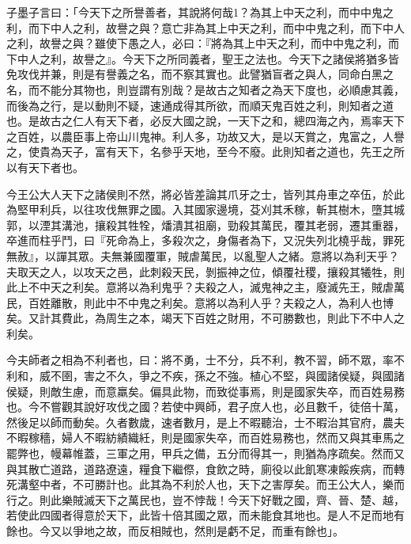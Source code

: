 
\begin{pinyinscope}
子墨子言曰：「今天下之所譽善者，其說將何哉1？為其上中天之利，而中中鬼之利，而下中人之利，故譽之與？意亡非為其上中天之利，而中中鬼之利，而下中人之利，故譽之與？雖使下愚之人，必曰：『將為其上中天之利，而中中鬼之利，而下中人之利，故譽之』。今天下之所同義者，聖王之法也。今天下之諸侯將猶多皆免攻伐并兼，則是有譽義之名，而不察其實也。此譬猶盲者之與人，同命白黑之名，而不能分其物也，則豈謂有別哉？是故古之知者之為天下度也，必順慮其義，而後為之行，是以動則不疑，速通成得其所欲，而順天鬼百姓之利，則知者之道也。是故古之仁人有天下者，必反大國之說，一天下之和，總四海之內，焉率天下之百姓，以農臣事上帝山川鬼神。利人多，功故又大，是以天賞之，鬼富之，人譽之，使貴為天子，富有天下，名參乎天地，至今不廢。此則知者之道也，先王之所以有天下者也。

今王公大人天下之諸侯則不然，將必皆差論其爪牙之士，皆列其舟車之卒伍，於此為堅甲利兵，以往攻伐無罪之國。入其國家邊境，芟刈其禾稼，斬其樹木，墮其城郭，以湮其溝池，攘殺其牲牷，燔潰其祖廟，勁殺其萬民，覆其老弱，遷其重器，卒進而柱乎鬥，曰『死命為上，多殺次之，身傷者為下，又況失列北橈乎哉，罪死無赦』，以譂其眾。夫無兼國覆軍，賊虐萬民，以亂聖人之緒。意將以為利天乎？夫取天之人，以攻天之邑，此刺殺天民，剝振神之位，傾覆社稷，攘殺其犧牲，則此上不中天之利矣。意將以為利鬼乎？夫殺之人，滅鬼神之主，廢滅先王，賊虐萬民，百姓離散，則此中不中鬼之利矣。意將以為利人乎？夫殺之人，為利人也博矣。又計其費此，為周生之本，竭天下百姓之財用，不可勝數也，則此下不中人之利矣。

今夫師者之相為不利者也，曰：將不勇，士不分，兵不利，教不習，師不眾，率不利和，威不圉，害之不久，爭之不疾，孫之不強。植心不堅，與國諸侯疑，與國諸侯疑，則敵生慮，而意羸矣。偏具此物，而致從事焉，則是國家失卒，而百姓易務也。今不嘗觀其說好攻伐之國？若使中興師，君子庶人也，必且數千，徒倍十萬，然後足以師而動矣。久者數歲，速者數月，是上不暇聽治，士不暇治其官府，農夫不暇稼穡，婦人不暇紡績織紝，則是國家失卒，而百姓易務也，然而又與其車馬之罷弊也，幔幕帷蓋，三軍之用，甲兵之備，五分而得其一，則猶為序疏矣。然而又與其散亡道路，道路遼遠，糧食下繼傺，食飲之時，廁役以此飢寒凍餒疾病，而轉死溝壑中者，不可勝計也。此其為不利於人也，天下之害厚矣。而王公大人，樂而行之。則此樂賊滅天下之萬民也，豈不悖哉！今天下好戰之國，齊、晉、楚、越，若使此四國者得意於天下，此皆十倍其國之眾，而未能食其地也。是人不足而地有餘也。今又以爭地之故，而反相賊也，然則是虧不足，而重有餘也」。


\end{pinyinscope}

